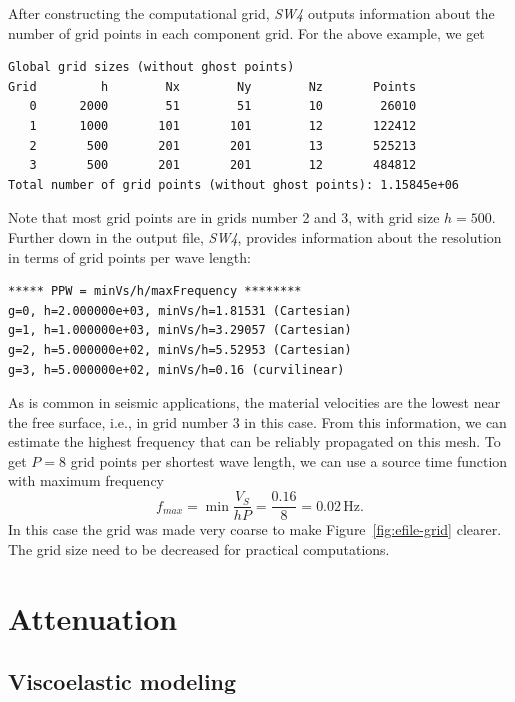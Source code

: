 \documentclass[11pt]{report}
\begin{document}
{After constructing the computational grid, \emph{SW4} outputs information about the number of grid
points in each component grid. For the above example, we get
\begin{verbatim}
Global grid sizes (without ghost points)
Grid         h        Nx        Ny        Nz       Points
   0      2000        51        51        10        26010
   1      1000       101       101        12       122412
   2       500       201       201        13       525213
   3       500       201       201        12       484812
Total number of grid points (without ghost points): 1.15845e+06
\end{verbatim}
Note that most grid points are in grids number 2 and 3, with grid size $h=500$. Further down in
the output file, \emph{SW4}, provides information about the resolution in terms of grid points per
wave length:
\begin{verbatim}
***** PPW = minVs/h/maxFrequency ********
g=0, h=2.000000e+03, minVs/h=1.81531 (Cartesian)
g=1, h=1.000000e+03, minVs/h=3.29057 (Cartesian)
g=2, h=5.000000e+02, minVs/h=5.52953 (Cartesian)
g=3, h=5.000000e+02, minVs/h=0.16 (curvilinear)
\end{verbatim}
As is common in seismic applications, the material velocities are the lowest near the free surface,
i.e., in grid number 3 in this case. From this information, we can estimate the highest frequency
that can be reliably propagated on this mesh. To get $P=8$ grid points per shortest wave length, we
can use a source time function with maximum frequency
\[
	f_{max} = \min\frac{V_S}{h P} = \frac{0.16}{8} = 0.02\, \mbox{Hz}.
\]
In this case the grid was made very coarse to make Figure~\ref{fig:efile-grid} clearer. The grid
size need to be decreased for practical computations.

\chapter{Attenuation}\label{sec:attenuation}
\section{Viscoelastic modeling}\label{sec:ve-model}

}
\end{document}
